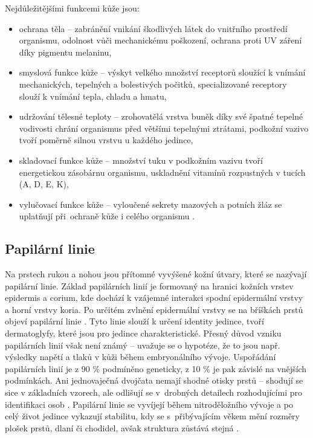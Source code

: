 Nejdůležitějšími funkcemi kůže jsou:
\begin{itemize}
    \item ochrana těla -- zabránění vnikání škodlivých látek do vnitřního prostředí organismu, odolnost vůči mechanickému poškození, ochrana proti UV záření díky pigmentu melaninu,
    \item smyslová funkce kůže -- výskyt velkého množství receptorů sloužící k vnímání mechanických, tepelných a bolestivých počitků, specializované receptory slouží k vnímání tepla, chladu a hmatu,
    \item udržování tělesné teploty -- zrohovatělá vrstva buněk díky své špatné tepelné vodivosti chrání organismus před většími tepelnými ztrátami, podkožní vazivo tvoří poměrně silnou vrstvu u každého jedince,
    \item skladovací funkce kůže -- množství tuku v podkožním vazivu tvoří energetickou zásobárnu organismu, uskladnění vitamínů rozpustných v tucích (A, D, E, K),
    \item vylučovací funkce kůže -- vyloučené sekrety mazových a potních žláz se uplatňují při~ochraně kůže i celého organismu \cite{ZakladyFunkcniAnatomieCloveka}.
\end{itemize}

\subsection*{Papilární linie}
Na prstech rukou a nohou jsou přítomné vyvýšené kožní útvary, které se nazývají papilární linie. Základ papilárních linií je formovaný na hranici kožních vrstev epidermis a corium, kde dochází k vzájemné interakci spodní epidermální vrstvy a horní vrstvy koria. Po určitém zvlnění epidermální vrstvy se na bříškách prstů objeví papilární linie \cite{DermatologickeFaktory}.  Tyto linie slouží k určení identity jedince, tvoří dermatoglyfy, které jsou pro jedince charakteristické. Přesný důvod vzniku papilárních linií však není známý -- uvažuje se o hypotéze, že to jsou např. výsledky napětí a tlaků v kůži během embryonálního vývoje. Uspořádání papilárních linií je z 90 \% podmíněno geneticky, z 10 \% je pak závislé na vnějších podmínkách. Ani jednovaječná dvojčata nemají shodné otisky prstů -- shodují se sice v základních vzorech, ale odlišují se v~drobných detailech rozhodujícími pro identifikaci osob \cite{Dermatoglyfika}. Papilární linie se vyvíjejí během nitroděložního vývoje a po celý život jedince vykazují stabilitu, kdy se s~přibývajícím věkem mění rozměry plošek prstů, dlaní či chodidel, avšak struktura zůstává stejná \cite{DermatologickeFaktory}. \\

